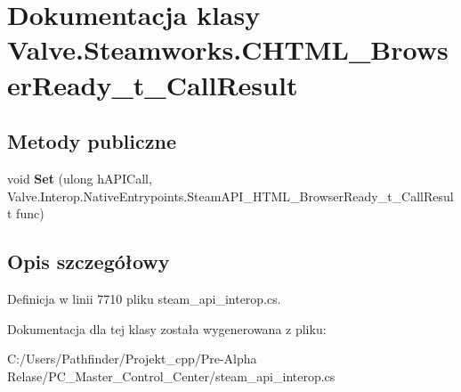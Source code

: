 \hypertarget{class_valve_1_1_steamworks_1_1_c_h_t_m_l___browser_ready__t___call_result}{}\section{Dokumentacja klasy Valve.\+Steamworks.\+C\+H\+T\+M\+L\+\_\+\+Browser\+Ready\+\_\+t\+\_\+\+Call\+Result}
\label{class_valve_1_1_steamworks_1_1_c_h_t_m_l___browser_ready__t___call_result}
\subsection*{Metody publiczne}
\begin{DoxyCompactItemize}
\item 
\mbox{\label{class_valve_1_1_steamworks_1_1_c_h_t_m_l___browser_ready__t___call_result_a41a995186d7e752827b4f20868f83902}} 
void {\bfseries Set} (ulong h\+A\+P\+I\+Call, Valve.\+Interop.\+Native\+Entrypoints.\+Steam\+A\+P\+I\+\_\+\+H\+T\+M\+L\+\_\+\+Browser\+Ready\+\_\+t\+\_\+\+Call\+Result func)
\end{DoxyCompactItemize}


\subsection{Opis szczegółowy}


Definicja w linii 7710 pliku steam\+\_\+api\+\_\+interop.\+cs.



Dokumentacja dla tej klasy została wygenerowana z pliku\+:\begin{DoxyCompactItemize}
\item 
C\+:/\+Users/\+Pathfinder/\+Projekt\+\_\+cpp/\+Pre-\/\+Alpha Relase/\+P\+C\+\_\+\+Master\+\_\+\+Control\+\_\+\+Center/steam\+\_\+api\+\_\+interop.\+cs\end{DoxyCompactItemize}
